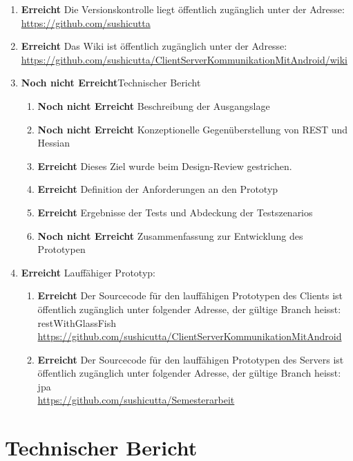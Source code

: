 \documentclass[listof=totocnumbered, bibliography=totocnumbered]{scrreprt}
\begin{document}
  \begin{enumerate}
    \item \textbf{Erreicht} Die Versionskontrolle liegt öffentlich zugänglich unter der
          Adresse:\\
          \url{https://github.com/sushicutta}
    \item \textbf{Erreicht} Das Wiki ist öffentlich zugänglich unter der
          Adresse:\\
          \url{https://github.com/sushicutta/ClientServerKommunikationMitAndroid/wiki}
    \item \textbf{Noch nicht Erreicht}Technischer Bericht
    \begin{enumerate}
      \item \textbf{Noch nicht Erreicht} Beschreibung der Ausgangslage
      \item \textbf{Noch nicht Erreicht} Konzeptionelle Gegenüberstellung von
            \ac{REST} und Hessian
      \item \textbf{Erreicht} Dieses Ziel wurde beim Design-Review gestrichen. 
      \item \textbf{Erreicht} Definition der Anforderungen an den Prototyp
      \item \textbf{Erreicht} Ergebnisse der Tests und Abdeckung der Testszenarios
      \item \textbf{Noch nicht Erreicht} Zusammenfassung zur Entwicklung des
            Prototypen
    \end{enumerate}
    \item \textbf{Erreicht} Lauffähiger Prototyp:
    \begin{enumerate}
      \item \textbf{Erreicht} Der Sourcecode für den lauffähigen Prototypen des
      Clients ist öffentlich zugänglich unter folgender Adresse, der gültige Branch
      heisst: restWithGlassFish\\
      \url{https://github.com/sushicutta/ClientServerKommunikationMitAndroid}
      \item \textbf{Erreicht} Der Sourcecode für den lauffähigen Prototypen des
      Servers ist öffentlich zugänglich unter folgender Adresse, der gültige Branch
      heisst: jpa\\
      \url{https://github.com/sushicutta/Semesterarbeit}
    \end{enumerate}
  \end{enumerate}
  
  \chapter{Technischer Bericht}
  
\end{document}
